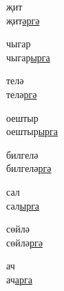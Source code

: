 \begin{multicols}{4}
\begin{enumerate}
\begin{minipage}{\linewidth}
    \item
    җит\\
    җит\underline{әр}\underline{гә}\\
\end{minipage}

\begin{minipage}{\linewidth}
    \item
    чыгар\\
    чыгар\underline{ыр}\underline{га}\\
\end{minipage}

\begin{minipage}{\linewidth}
    \item
    телә\\
    телә\underline{р}\underline{гә}\\
\end{minipage}

\begin{minipage}{\linewidth}
    \item
    оештыр\\
    оештыр\underline{ыр}\underline{га}\\
\end{minipage}

\begin{minipage}{\linewidth}
    \item
    билгелә\\
    билгелә\underline{р}\underline{гә}\\
\end{minipage}

\begin{minipage}{\linewidth}
    \item
    сал\\
    сал\underline{ыр}\underline{га}\\
\end{minipage}

\begin{minipage}{\linewidth}
    \item
    сөйлә\\
    сөйлә\underline{р}\underline{гә}\\
\end{minipage}

\begin{minipage}{\linewidth}
    \item
    ач\\
    ач\underline{ар}\underline{га}\\
\end{minipage}


\end{enumerate}
\end{multicols}
